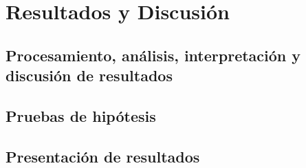 	\chapter{Resultados y Discusión}
		\section{Procesamiento, análisis, interpretación y discusión de resultados}
		\section{Pruebas de hipótesis }
		\section{Presentación de resultados}